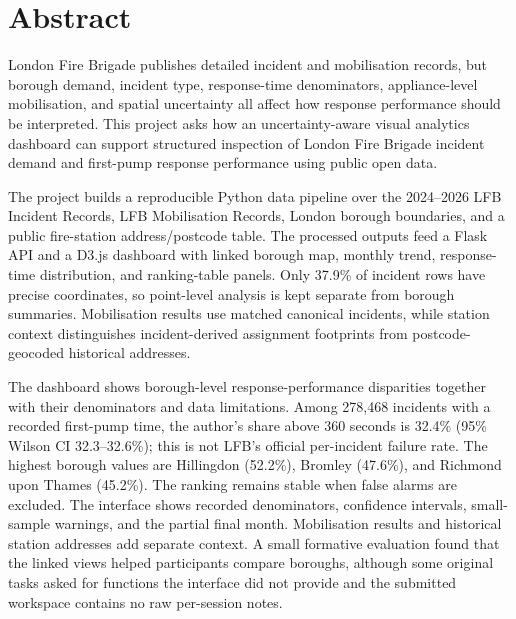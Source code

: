 \section*{Abstract}

London Fire Brigade publishes detailed incident and mobilisation records, but borough demand, incident type, response-time denominators, appliance-level mobilisation, and spatial uncertainty all affect how response performance should be interpreted. This project asks how an uncertainty-aware visual analytics dashboard can support structured inspection of London Fire Brigade incident demand and first-pump response performance using public open data.

The project builds a reproducible Python data pipeline over the 2024--2026 LFB Incident Records, LFB Mobilisation Records, London borough boundaries, and a public fire-station address/postcode table. The processed outputs feed a Flask API and a D3.js dashboard with linked borough map, monthly trend, response-time distribution, and ranking-table panels. Only 37.9\% of incident rows have precise coordinates, so point-level analysis is kept separate from borough summaries. Mobilisation results use matched canonical incidents, while station context distinguishes incident-derived assignment footprints from postcode-geocoded historical addresses.

The dashboard shows borough-level response-performance disparities together with their denominators and data limitations. Among 278,468 incidents with a recorded first-pump time, the author's share above 360 seconds is 32.4\% (95\% Wilson CI 32.3--32.6\%); this is not LFB's official per-incident failure rate. The highest borough values are Hillingdon (52.2\%), Bromley (47.6\%), and Richmond upon Thames (45.2\%). The ranking remains stable when false alarms are excluded. The interface shows recorded denominators, confidence intervals, small-sample warnings, and the partial final month. Mobilisation results and historical station addresses add separate context. A small formative evaluation found that the linked views helped participants compare boroughs, although some original tasks asked for functions the interface did not provide and the submitted workspace contains no raw per-session notes.

\clearpage
